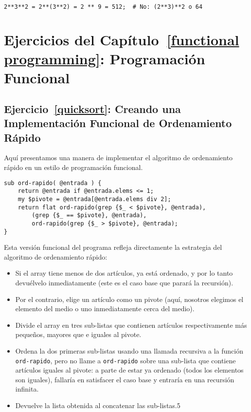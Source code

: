 \begin{verbatim}
2**3**2 = 2**(3**2) = 2 ** 9 = 512;  # No: (2**3)**2 o 64
\end{verbatim}



\section{Ejercicios del Capítulo~\ref{functional programming}: Programación
Funcional}

\subsection{Ejercicio~\ref{quicksort}: Creando una Implementación Funcional de Ordenamiento Rápido}
\label{sol_quicksort}

Aquí presentamos una manera de implementar el algoritmo
de ordenamiento rápido en un estilo de programación funcional.

\begin{verbatim}
sub ord-rapido( @entrada ) {
    return @entrada if @entrada.elems <= 1;
    my $pivote = @entrada[@entrada.elems div 2];
    return flat ord-rapido(grep {$_ < $pivote}, @entrada), 
        (grep {$_ == $pivote}, @entrada), 
        ord-rapido(grep {$_ > $pivote}, @entrada);
}
\end{verbatim}

Esta versión funcional del programa refleja directamente 
la estrategia del algoritmo de ordenamiento rápido:

\begin{itemize}
\item Si el array tiene menos de dos artículos, ya está
ordenado, y por lo tanto devuélvelo inmediatamente (este es
el caso base que parará la recursión).
\item Por el contrario, elige un artículo como un pivote
(aquí, nosotros elegimos el elemento del medio o uno 
inmediatamente cerca del medio).
\item Divide el array en tres sub-listas que contienen 
artículos respectivamente más pequeños, mayores que e iguales
al pivote.
\item Ordena la dos primeras sub-listas usando una llamada recursiva
a la función \verb|ord-rapido|, pero no llame a \verb|ord-rapido| sobre
una sub-lista que contiene artículos iguales al pivote: a parte
de estar ya ordenado (todos los elementos son iguales), fallaría 
en satisfacer el caso base y entraría en una recursión infinita.
\item  Devuelve la lista obtenida al concatenar las sub-listas.5
\end{itemize}



